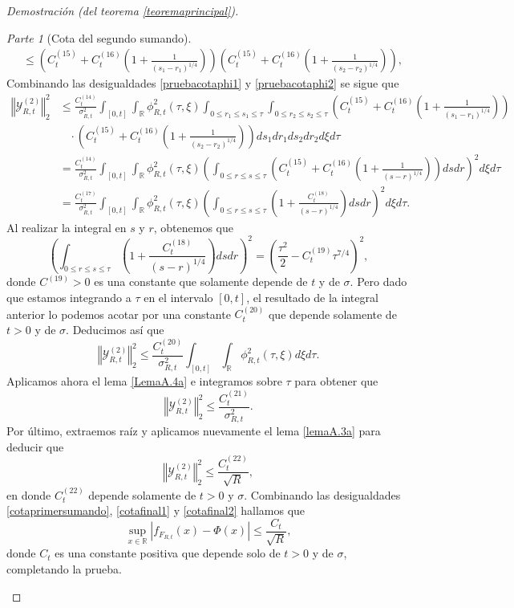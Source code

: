 \documentclass[letterpaper,twoside,12pt]{book}
\newcommand{\R}{\mathbb{R}}
\newcommand{\1}{\mathds{1}}
\newcommand{\abs}[1]{\left\lvert #1 \right\rvert}
\newcommand{\norm}[1]{\left\Vert #1 \right\Vert}
\theoremstyle{definition}
\theoremstyle{definition}
\theoremstyle{remark}
\newtheorem{proofpart}{Parte}
\theoremstyle{definition}
\theoremstyle{definition}
\theoremstyle{definition}
\theoremstyle{definition}
\theoremstyle{definition}
\begin{document}
\begin{proof}[Demostración (del teorema \ref{teoremaprincipal})]
\begin{proofpart}[Cota del segundo sumando]
\begin{align}
   &\leq\left(C_t^{(15)}+C_t^{(16)}\left(1+\frac{1}{(s_1-r_1)^{1/4}}\right)\right)\left(C_t^{(15)}+C_t^{(16)}\left(1+\frac{1}{(s_2-r_2)^{1/4}}\right)\right),\label{pruebacotaphi2}                      
\end{align}
Combinando las desigualdades \eqref{pruebacotaphi1} y \eqref{pruebacotaphi2} se sigue que 
\begin{align*}
   \norm{\mathcal{Y}_{R,t}^{(2)}}_2^2&\leq  \frac{C_t^{(14)}}{\sigma_{R,t}^2}\int_{[0,t]}\int_\R\phi_{R,t}^2(\tau,\xi)\int_{0\leq r_1\leq s_1\leq \tau}\int_{0\leq r_2\leq s_2\leq \tau}\left(C_t^{(15)}+C_t^{(16)}\left(1+\frac{1}{(s_1-r_1)^{1/4}}\right)\right)\\
   &\ \ \ \ \cdot\left(C_t^{(15)}+C_t^{(16)}\left(1+\frac{1}{(s_2-r_2)^{1/4}}\right)\right)ds_1dr_1ds_2dr_2d\xi d\tau\\
   &=\frac{C_t^{(14)}}{\sigma_{R,t}^2}\int_{[0,t]}\int_\R\phi_{R,t}^2(\tau,\xi)\left(\int_{0\leq r\leq s\leq \tau}\left(C_t^{(15)}+C_t^{(16)}\left(1+\frac{1}{(s-r)^{1/4}}\right)\right)ds dr\right)^2d\xi d\tau\\
   &=\frac{C_t^{(17)}}{\sigma_{R,t}^2}\int_{[0,t]}\int_\R\phi_{R,t}^2(\tau,\xi)\left(\int_{0\leq r\leq s\leq \tau}\left(1+\frac{C_t^{(18)}}{(s-r)^{1/4}}\right)ds dr\right)^2d\xi d\tau.
\end{align*}
Al realizar la integral en $s$ y $r$, obtenemos que 
\[
   \left(\int_{0\leq r\leq s\leq \tau}\left(1+\frac{C_t^{(18)}}{(s-r)^{1/4}}\right)ds dr\right)^2=\left(\frac{\tau^2}{2}-C^{(19)}_t\tau^{7/4}\right)^2,
\]
donde $C^{(19)}>0$ es una constante que solamente depende de $t$ y de $\sigma$. Pero dado que estamos integrando a $\tau$ en el intervalo $[0,t]$, el resultado de la integral anterior lo podemos acotar por una constante $C_t^{(20)}$ que depende solamente de $t>0$ y de $\sigma$. Deducimos así que
\[
   \norm{\mathcal{Y}_{R,t}^{(2)}}_2^2\leq \frac{C^{(20)}_t}{\sigma_{R,t}^2}\int_{[0,t]}\int_\R\phi_{R,t}^2(\tau,\xi)d\xi d\tau.
\]
Aplicamos ahora el lema \ref{LemaA.4a} e integramos sobre $\tau$ para obtener que 
\[
   \norm{\mathcal{Y}_{R,t}^{(2)}}_2^2\leq \frac{C^{(21)}_t}{\sigma_{R,t}^2}.
\] 
Por último, extraemos raíz y aplicamos nuevamente el lema \ref{lemaA.3a} para deducir que  
\begin{equation}\label{cotafinal2}
   \norm{\mathcal{Y}_{R,t}^{(2)}}_2^2\leq \frac{C^{(22)}_t}{\sqrt{R}},
\end{equation}
en donde $C_t^{(22)}$ depende solamente de $t>0$ y $\sigma$. Combinando las desigualdades \eqref{cotaprimersumando}, \eqref{cotafinal1} y \eqref{cotafinal2} hallamos que 
\[
   \sup_{x\in \R} \abs{f_{F_{R,t}}(x)-\Phi(x)}\leq \frac{C_t}{\sqrt{R}},
\]
donde $C_t$ es una constante positiva que depende solo de $t>0$ y de $\sigma$, completando la prueba.
\end{proofpart}
\qedhere
\end{proof}
\end{document}
